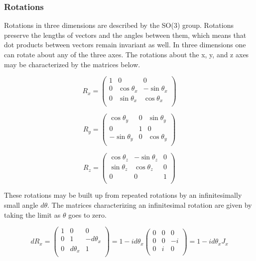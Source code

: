 \subsubsection{Rotations}

Rotations in three dimensions are described by the SO(3) group. Rotations preserve the lengths of vectors and the angles between them, which means that dot products between vectors remain invariant as well. In three dimensions one can rotate about any of the three axes. The rotations about the x, y, and z axes may be characterized by the matrices below.

\begin{equation}
R_x = 
\begin{pmatrix}
1 & 0 & 0 \\
0 & \cos\theta_x & -\sin\theta_x \\
0 & \sin\theta_x & \cos\theta_x \\
\end{pmatrix}
\end{equation}

\begin{equation}
R_y = 
\begin{pmatrix}
\cos\theta_y & 0 & \sin\theta_y \\
0 & 1 & 0 \\
-\sin\theta_y & 0 & \cos\theta_y \\
\end{pmatrix}
\end{equation}

\begin{equation}
R_z = 
\begin{pmatrix}
\cos\theta_z & -\sin\theta_z & 0 \\
\sin\theta_z & \cos\theta_z & 0 \\
0 & 0 & 1 \\
\end{pmatrix}
\end{equation}

These rotations may be built up from repeated rotations by an infinitesimally small angle $d\theta$. The matrices characterizing an infinitesimal rotation are given by taking the limit as $\theta$ goes to zero.

\begin{equation}
dR_x = 
\begin{pmatrix}
1 & 0 & 0 \\
0 & 1 & -d\theta_x \\
0 & d\theta_x & 1 \\
\end{pmatrix}
= 1 - id\theta_x
\begin{pmatrix}
0 & 0 & 0 \\
0 & 0 & -i \\
0 & i & 0 \\
\end{pmatrix}
= 1 - id\theta_x J_x
\end{equation}

